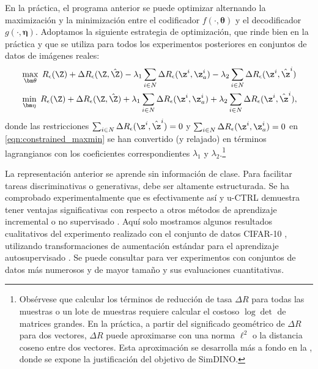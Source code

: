 \documentclass[../../book-main_es.tex]{subfiles}
\begin{document}
En la práctica, el programa anterior se puede optimizar alternando
la maximización y la minimización entre el codificador $f(\cdot,\bm
\theta)$ y el decodificador $g(\cdot,\bm \eta)$. Adoptamos la siguiente
estrategia de optimización, que rinde bien en la práctica y que se utiliza para
todos los experimentos posteriores en conjuntos de datos de imágenes reales:
\vspace{-1mm}
\begin{align}
&  \max_{\bm \theta}\; R_\epsilon(\Z) + \Delta R_\epsilon(\Z,
\hat{\Z}) -\lambda_{1}\sum_{i\in N} \Delta R_\epsilon(\z^i, \z_{a}^i)
-\lambda_{2}\sum_{i\in N} \Delta R_\epsilon(\z^i, \hat{\z}^i)
\label{eqn:constrained_max} \\
& \min_{\bm \eta}\; R_\epsilon(\Z) + \Delta R_\epsilon(\Z,
\hat{\Z}) +\lambda_{1}\sum_{i\in N} \Delta R_\epsilon(\z^i, \z_{a}^i)+
\lambda_{2}\sum_{i\in N} \Delta R_\epsilon(\z^i, \hat{\z}^i)
\label{eqn:constrained_min},
\end{align}
donde las restricciones $\sum_{i\in N} \Delta R_\epsilon(\z^i,
\hat{\z}^i) = 0$ y $\sum_{i\in N} \Delta R_\epsilon(\z^i, \z_{a}^i)
= 0$ en \eqref{eqn:constrained_maxmin} se han convertido (y
relajado) en términos lagrangianos con los coeficientes correspondientes
$\lambda_{1}$ y  $\lambda_{2}$.\footnote{Obsérvese que calcular los
términos de reducción de tasa $\Delta R$ para todas las muestras o un lote de muestras
requiere calcular el costoso $\log\det$ de matrices grandes. En
la práctica, a partir del significado geométrico de $\Delta R$ para dos vectores,
$\Delta R$ puede aproximarse con una norma $\ell^2$ o la distancia coseno
entre dos vectores. Esta aproximación se desarrolla más a fondo
en la , donde se expone la justificación del objetivo de SimDINO.}

La representación anterior se aprende sin información de clase. Para
facilitar tareas discriminativas o generativas, debe ser altamente estructurada.
Se ha comprobado experimentalmente que es efectivamente así 
y u-CTRL demuestra tener ventajas significativas con respecto a
otros métodos de aprendizaje incremental o no supervisado
\cite{pmlr-v234-tong24a}. Aquí solo mostramos algunos resultados cualitativos
del experimento realizado con el conjunto de datos CIFAR-10
\cite{krizhevsky2014cifar}, utilizando transformaciones de aumentación estándar para
el aprendizaje autosupervisado \cite{chen2020simple}. Se puede consultar
\cite{pmlr-v234-tong24a} para ver experimentos con conjuntos de datos más numerosos y de mayor tamaño
y sus evaluaciones cuantitativas.
\end{document}
